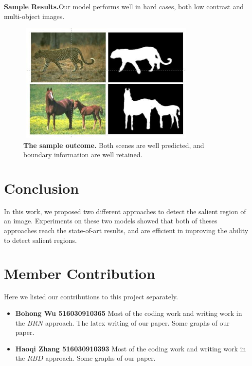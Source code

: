 \documentclass[10pt,journal, compsoc]{IEEEtran}
\begin{document}
\noindent\textbf{Sample Results.}Our model performs well in hard cases, both low contrast and multi-object images.
\begin{figure}[!htbp]
	\centering
	\includegraphics[height=6cm,width=9.0cm]{figures/sample.jpg}
	\caption{\textbf{The sample outcome.}  Both scenes are well predicted, and boundary information are well retained.}
\end{figure}


\section{Conclusion}
In this work, we proposed two different approaches to detect the salient region of an image. Experiments on these two models showed that both of theses approaches reach the state-of-art results, and are efficient in improving the ability to detect salient regions.

\section{Member Contribution}
Here we listed our contributions to this project separately.
\begin{itemize}
    \item \textbf{Bohong Wu 516030910365} Most of the coding work and writing work in the $BRN$ approach. The latex writing of our paper. Some graphs of our paper.
    \item \textbf{Haoqi Zhang 516030910393} Most of the coding work and writing work in the $RBD$ approach. Some graphs of our paper.
\end{itemize}





\ifCLASSOPTIONcaptionsoff
  \newpage
\fi
\end{document}
